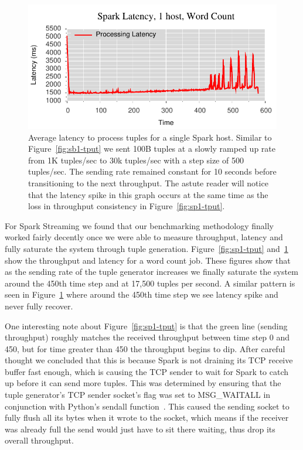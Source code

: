 \begin{figure}[t]
\centering
\includegraphics[width=1\linewidth]{figures/sp1_latency.pdf}
\caption{Average latency to process tuples for a single Spark host. Similar to
Figure~\ref{fig:sb1-tput} we sent 100B tuples at a slowly ramped up rate from 1K
tuples/sec to 30k tuples/sec with a step size of 500 tuples/sec. The sending
rate remained constant for 10 seconds before transitioning to the next
throughput. The astute reader will notice that the latency spike in this graph
occurs at the same time as the loss in throughput consistency in
Figure~\ref{fig:sp1-tput}.}
\label{fig:sp1-latency}
\end{figure}

For Spark Streaming we found that our benchmarking methodology finally worked
fairly decently once we were able to measure throughput, latency and fully
saturate the system through tuple generation. Figure~\ref{fig:sp1-tput}
and~\ref{fig:sp1-latency} show the throughput and latency for a word count job. These
figures show that as the sending rate of the tuple generator increases we
finally saturate the system around the 450th time step and at 17,500 tuples per
second. A similar pattern is seen in Figure~\ref{fig:sp1-latency} where around
the 450th time step we see latency spike and never fully recover. 

One interesting note about Figure~\ref{fig:sp1-tput} is that the green line
(sending throughput) roughly matches the received throughput between time step
0 and 450, but for time greater than 450 the throughput begins to dip. After
careful thought we concluded that this is because Spark is not draining its TCP
receive buffer fast enough, which is causing the TCP sender to wait for Spark
to catch up before it can send more tuples. This was determined by ensuring
that the tuple generator's TCP sender socket's flag was set to MSG\_WAITALL in
conjunction with Python's sendall function~\cite{python-sockets}. This caused
the sending socket to fully flush all its bytes when it wrote to the socket,
which means if the receiver was already full the send would just have to sit
there waiting, thus drop its overall throughput.



